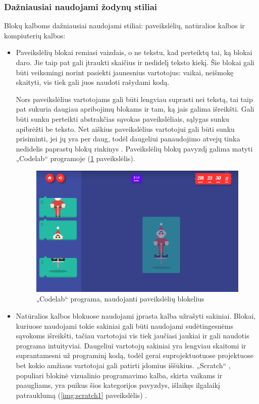 \documentclass{VUMIFPSkursinis}
\begin{document}
\subsubsection{Dažniausiai naudojami žodynų stiliai}
\label{section:dazniausiStiliai}

Blokų kalboms dažniausiai naudojami stiliai: paveikslėlių, natūralios kalbos ir kompiuterių kalbos:
\begin{itemize}
    \item Paveikslėlių blokai remiasi vaizdais, o ne tekstu, kad perteiktų tai, ką blokai daro. Jie taip pat gali įtraukti skaičius ir nedidelį teksto kiekį. Šie blokai gali būti veiksmingi norint pasiekti jaunesnius vartotojus: vaikai, neišmokę skaityti, vis tiek gali juos naudoti rašydami kodą.
    
    Nors paveikslėlius vartotojams gali būti lengviau suprasti nei tekstą, tai taip pat sukuria daugiau apribojimų blokams ir tam, ką jais galima išreikšti. Gali būti sunku perteikti abstrakčias sąvokas paveikslėliais, sąlygas sunku apibrėžti be teksto. Net aiškius paveikslėlius vartotojui gali būti sunku prisiminti, jei jų yra per daug, todėl daugeliui panaudojimo atvejų tinka nedidelis paprastų blokų rinkinys \cite{pasternak2017tips}. Paveikslėlių blokų pavyzdį galima matyti „Codelab“ programoje (\ref{img:codeLab} paveikslėlis).
    
    \begin{figure}[H]
    \centering
    \includegraphics[scale=0.3]{img/santatracker.png}
    \caption{„Codelab“ programa, naudojanti paveikslėlių blokelius \cite{codeLab}}
    \label{img:codeLab}
    \end{figure}
    
    \item Natūralios kalbos blokuose naudojami įprasta kalba užrašyti sakiniai. Blokai, kuriuose naudojami tokie sakiniai gali būti naudojami sudėtingesnėms sąvokoms išreikšti, tačiau vartotojai vis tiek jaučiasi jaukiai ir gali naudotis programa intuityviai. Daugeliui vartotojų sakiniai yra lengviau skaitomi ir suprantamesni už programinį kodą, todėl gerai suprojektuotuose projektuose bet kokio amžiaus vartotojai gali patirti įdomius iššūkius. „Scratch“ \cite{scratch}, populiari blokinė vizualinio programavimo kalba, skirta vaikams ir paaugliams, yra puikus šios kategorijos pavyzdys, išlaikęs ilgalaikį patrauklumą (\ref{img:scratch1} paveikslėlis) \cite{pasternak2017tips}.
    

\end{itemize}
\end{document}
